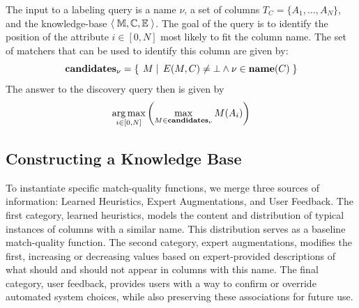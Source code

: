 The input to a labeling query is a name $\nu$, a set of columns $T_C = \{A_1, \ldots, A_N\}$, and the knowledge-base $\left<\;{\mathbb M, \mathbb C, \mathbb E}\;\right>$. 
The goal of the query is to identify the position of the attribute $i \in [0,N]$ most likely to fit the column name.
The set of matchers that can be used to identify this column are given by:
$$\textbf{candidates}_\nu = \left\{\left.\;{M}\;\right|\;{E(M, C) \neq \bot \wedge \nu \in \textbf{name}(C)}\;\right\}$$
The answer to the discovery query then is given by
$$\operatorname*{arg\,max}_{i \in [0,N]} \left( \max_{M \in \textbf{candidates}_\nu} M(A_i)\right)$$

\subsection{Constructing a Knowledge Base}
To instantiate specific match-quality functions, we merge three sources of information: Learned Heuristics, Expert Augmentations, and User Feedback. 
The first category, learned heuristics, models the content and distribution of typical instances of columns with a similar name.
This distribution serves as a baseline match-quality function.
The second category, expert augmentations, modifies the first, increasing or decreasing values based on expert-provided descriptions of what should and should not appear in columns with this name.
The final category, user feedback, provides users with a way to confirm or override automated system choices, while also preserving these associations for future use.

